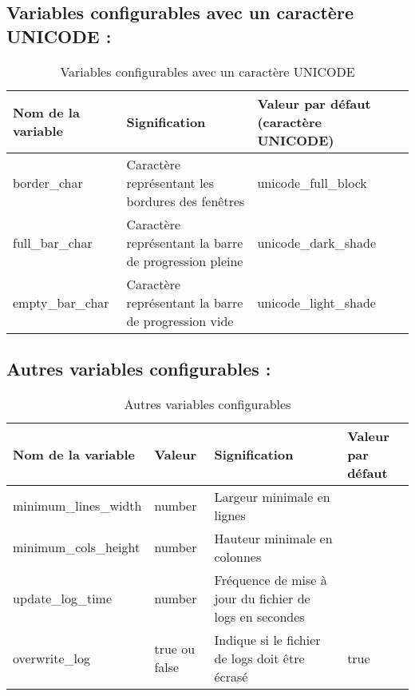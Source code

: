 \documentclass{article}
\begin{document}
\newpage
\subsection{Variables configurables avec un caractère UNICODE :}
\begin{table}[h!]
    \centering
    \renewcommand{\arraystretch}{1.5}
    \footnotesize
    \begin{tabular}{|>{\centering\arraybackslash}m{3cm}|>{\centering\arraybackslash}m{3cm}|>{\centering\arraybackslash}m{3.5cm}|}
        \hline
        \textbf{Nom de la variable} & \textbf{Signification} & \textbf{Valeur par défaut (caractère UNICODE)} \\
        \hline
        border\_char & Caractère représentant les bordures des fenêtres & unicode\_full\_block \\
        \hline
        full\_bar\_char & Caractère représentant la barre de progression pleine & unicode\_dark\_shade \\
        \hline
        empty\_bar\_char & Caractère représentant la barre de progression vide & unicode\_light\_shade \\
        \hline
    \end{tabular}
    \label{tab:configable_unicode_var}
    \caption{Variables configurables avec un caractère UNICODE}
\end{table}

\vspace{2em}
\subsection{Autres variables configurables :}
\begin{table}[h!]
    \centering
    \renewcommand{\arraystretch}{1.5}
    \footnotesize
    \begin{tabular}{|>{\centering\arraybackslash}m{3cm}|>{\centering\arraybackslash}m{1.6cm}|>{\centering\arraybackslash}m{3cm}|>{\centering\arraybackslash}m{1.6cm}|}
        \hline
        \textbf{Nom de la variable} & \textbf{Valeur} & \textbf{Signification} & \textbf{Valeur par défaut} \\
        \hline
        minimum\_lines\_width & number & Largeur minimale en lignes & 30 \\
        \hline
        minimum\_cols\_height & number & Hauteur minimale en colonnes & 70 \\
        \hline
        update\_log\_time & number & Fréquence de mise à jour du fichier de logs en secondes & 60 \\
        \hline
        overwrite\_log & true ou false & Indique si le fichier de logs doit être écrasé & true \\
        \hline
    \end{tabular}
    \label{tab:configable_other_var}
    \caption{Autres variables configurables}
\end{table}
\end{document}
